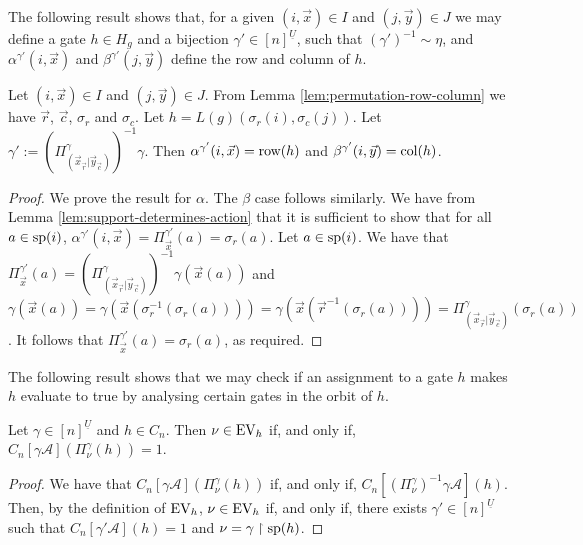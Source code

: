 \documentclass[../paper.tex]{subfiles}
\begin{document}
The following result shows that, for a given $(i, \vec{x}) \in I$ and $(j,
\vec{y}) \in J$ we may define a gate $h \in H_g$ and a bijection $\gamma' \in
[n]^{\underline{U}}$, such that $(\gamma')^{-1} \sim \eta$, and
$\alpha^{\gamma'}(i, \vec{x})$ and $\beta^{\gamma'}(j, \vec{y})$ define the row
and column of $h$.

\begin{lem}
  \label{lem:defining-h-from-IJ}
  Let $(i, \vec{x}) \in I$ and $(j, \vec{y}) \in J$. From Lemma
  \ref{lem:permutation-row-column} we have $\vec{r}$, $\vec{c}$, $\sigma_r$ and
  $\sigma_c$. Let $h = L(g) (\sigma_r (i), \sigma_c (j))$. Let $\gamma' :=
  (\Pi^{\gamma}_{(\vec{x}_{\vec{r}} \vert \vec{y}_{\vec{c}})})^{-1} \gamma$.
  Then $\alpha^{\gamma'} (i, \vec{x}) = \text{row} (h)$ and $\beta^{\gamma'}
  (i,\vec{y}) = \text{col}(h)$.
\end{lem}
\begin{proof}
  We prove the result for $\alpha$. The $\beta$ case follows similarly. We have
  from Lemma \ref{lem:support-determines-action} that it is sufficient to show
  that for all $a \in \text{sp}(i)$, $\alpha^{\gamma'}(i, \vec{x}) =
  \Pi^{\gamma'}_{\vec{x}} (a) = \sigma_r (a)$. Let $a \in \text{sp}(i)$. We have
  that $\Pi^{\gamma'}_{\vec{x}} (a) = (\Pi^{\gamma}_{(\vec{x}_{\vec{r}} \vert
    \vec{y}_{\vec{c}})})^{-1} \gamma (\vec{x} (a))$ and $\gamma (\vec{x}(a)) =
  \gamma (\vec{x} (\sigma^{-1}_r(\sigma_r(a)))) = \gamma (\vec{x} (\vec{r}^{-1}
  (\sigma_r(a)))) = \Pi^{\gamma}_{(\vec{x}_{\vec{r}} \vert
    \vec{y}_{\vec{c}})}(\sigma_r(a))$. It follows that
  $\Pi^{\gamma'}_{\vec{x}}(a) = \sigma_r(a)$, as required.
\end{proof}

The following result shows that we may check if an assignment to a gate $h$
makes $h$ evaluate to true by analysing certain gates in the orbit of $h$.

\begin{lem}
  Let $\gamma\in [n]^{\underline{U}}$ and $h \in C_n$. Then $\nu \in \text{EV}_h$ if,
  and only if, $C_n[\gamma \mathcal{A}](\Pi^{\gamma}_\nu (h)) = 1$.
  \label{lem:translate-EV-circuits}
\end{lem}
\begin{proof}
  We have that $C_n[\gamma \mathcal{A}](\Pi^{\gamma}_\nu(h))$ if, and only if,
  $C_n[(\Pi^{\gamma}_{\nu})^{-1}\gamma \mathcal{A}] (h)$. Then, by the
  definition of $\text{EV}_h$, $\nu \in \text{EV}_h$ if, and only if, there exists $\gamma'
  \in [n]^{\underline{U}}$ such that $C_n[\gamma' \mathcal{A}](h) = 1$ and $\nu
  = \gamma\restriction{\text{sp}(h)}$.
\end{proof}
\end{document}
